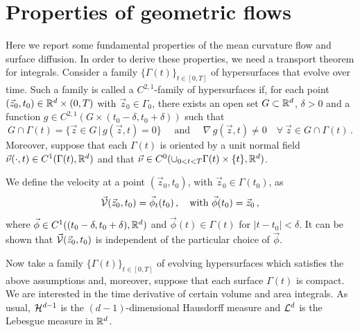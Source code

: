 \section{Properties of geometric flows}\label{sec:geometric_flows_properties}
Here we report some fundamental properties of the mean curvature flow and
surface diffusion. In order to derive these properties, we need a transport
theorem for integrals. Consider a family $\{ \Gamma(t) \}_{t \in [0, T]}$
of hypersurfaces that evolve over time. Such a family is called a
$C^{2,1}$-family of hypersurfaces if, for each point $(\vec z_0, t_0) \in
{\mathbb R}^d \times (0, T)$ with $\vec z_0 \in \Gamma_0$, there exists an
open set $G \subset {\mathbb R}^d$, $\delta > 0$ and a function
$g \in C^{2,1}(G \times (t_0 - \delta, t_0 + \delta))$ such that
\begin{equation}
G \cap \Gamma (t) = \{ \vec z \in G \, | \, g (\vec z, t) = 0 \}
\quad \mbox{ and } \quad \nabla \, g (\vec z, t) \neq 0
\quad \forall\ \vec z \in G \cap \Gamma(t) \, .
\end{equation}
\sloppy Moreover, suppose that each $\Gamma(t)$ is oriented by a unit normal
field ${\vec \nu(\cdot,t)\in C^1(\Gamma(t),{\mathbb R}^d)}$ and that $\vec \nu\in
C^0(\cup_{0<t<T}\Gamma(t)\times\{t\},{\mathbb R}^d)$.

We define the velocity at a point $(\vec z_0,t_0)$, with $\vec z_0\in
\Gamma(t_0)$, as
\begin{equation}
\vec{\mathcal{V}}(\vec z_0,t_0)= \vec \phi_t(t_0)\,, \quad
\mbox{with }\vec \phi(t_0)=\vec z_0\,,
\end{equation}
where $\vec \phi\in C^1((t_0 - \delta, t_0 + \delta),{\mathbb R}^d)$ and
$\vec \phi(t)\in\Gamma(t)$ for $|t-t_0|<\delta$. It can be shown that $\vec{\mathcal{V}}(\vec
z_0,t_0)$ is independent of the particular choice of $\vec \phi$.

Now take a family $\{ \Gamma(t) \}_{t \in [0, T]}$ of evolving hypersurfaces
which satisfies the above assumptions and, moreover, suppose that each surface
$\Gamma(t)$ is compact. We are interested in the time derivative of certain
volume and area integrals. As usual, $\mathcal{H}^{d-1}$ is the $(d-1)$-dimensional
Hausdorff measure and $\mathcal{L}^d$ is the Lebesgue measure in ${\mathbb R}^d$.


